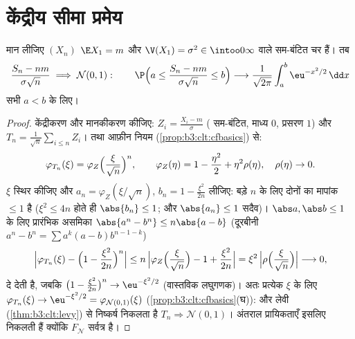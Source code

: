 \section{केंद्रीय सीमा प्रमेय}

\begin{theorem}[केंद्रीय सीमा प्रमेय]\label{thm:b3:clt:clt}
मान लीजिए $(X_n)$ $\E X_1 = m$ और $\V(X_1) =
\sigma^2 \in \intoo0\infty$ वाले  सम-बंटित चर हैं।
तब
\[
\frac{S_n - nm}{\sigma\sqrt n} \;\Longrightarrow\; \mathcal
N(0, 1) :
\qquad
\P\Bigl(a \leq \frac{S_n - nm}{\sigma\sqrt n} \leq
b\Bigr) \longrightarrow
\frac{1}{\sqrt{2\pi}}\int_a^b\eu^{-x^2/2}\,\dd x
\]
सभी $a < b$ के लिए।
\end{theorem}

\begin{proof}
केंद्रीकरण और मानकीकरण कीजिए: $Z_i = \frac{X_i - m}{\sigma}$ ( सम-बंटित, माध्य $0$,
प्रसरण $1$) और $T_n =
\frac1{\sqrt n}\sum_{i\leq n}Z_i$।  तथा आफ़ीन नियम (\cref{prop:b3:clt:cfbasics}) से:
\[
\varphi_{T_n}(\xi) =
\varphi_{Z}\Bigl(\frac{\xi}{\sqrt n}\Bigr)^{n},
\qquad
\varphi_Z(\eta) = 1 - \frac{\eta^2}2 + \eta^2\rho(\eta),\quad
\rho(\eta)\to0 .
\]
$\xi$ स्थिर कीजिए और $a_n = \varphi_Z(\xi/\sqrt n)$, $b_n = 1 -
\frac{\xi^2}{2n}$ लीजिए: बड़े $n$ के लिए दोनों
का मापांक $\leq 1$ है ($\xi^2 \leq 4n$ होते ही $\abs{b_n} \leq 1$; और $\abs{a_n} \leq 1$ सदैव)। $\abs a, \abs b \leq 1$ के
लिए प्रारंभिक असमिका $\abs{a^n - b^n} \leq
n\abs{a - b}$ (दूरबीनी $a^n - b^n = \sum a^k(a - b)b^{n-1-k}$)
\[
\Bigl|\varphi_{T_n}(\xi) - \Bigl(1 -
\frac{\xi^2}{2n}\Bigr)^{n}\Bigr|
\leq n\,\Bigl|\varphi_Z\Bigl(\frac\xi{\sqrt n}\Bigr) - 1 +
\frac{\xi^2}{2n}\Bigr|
= \xi^2\,\Bigl|\rho\Bigl(\frac{\xi}{\sqrt n}\Bigr)\Bigr|
\longrightarrow 0,
\]
दे देती है, जबकि $\bigl(1 - \frac{\xi^2}{2n}\bigr)^n \to
\eu^{-\xi^2/2}$ (वास्तविक लघुगणक)। अतः प्रत्येक $\xi$ के लिए
$\varphi_{T_n}(\xi) \to
\eu^{-\xi^2/2} = \varphi_{\mathcal N(0,1)}(\xi)$ (\cref{prop:b3:clt:cfbasics}(घ)): और लेवी (\cref{thm:b3:clt:levy}) से निष्कर्ष निकलता है $T_n \Rightarrow \mathcal
N(0,1)$।
अंतराल प्रायिकताएँ इसलिए निकलती हैं क्योंकि $F_{\mathcal
N}$ सर्वत्र  है।
\end{proof}

